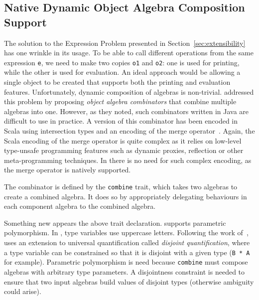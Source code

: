 \subsection{Native Dynamic Object Algebra Composition Support}
\label{sec:dynamic}

The solution to the Expression Problem presented in
Section~\ref{sec:extensibility} has one wrinkle in its usage. To be able to call
different operations from the same expression \lstinline{e}, we need to make two
copies \lstinline{o1} and \lstinline{o2}: one is used for printing, while the
other is used for evaluation. An ideal approach would be allowing a single object
to be created that supports both the printing and evaluation features.
Unfortunately, dynamic composition of algebras is non-trivial.
\citet{oliveira2012extensibility} addressed this problem by proposing
\textit{object algebra combinators} that combine multiple algebras into one.
However, as they noted, such combinators written in Java are difficult to use in
practice. A version of this combinator has been encoded in Scala using
intersection types and an encoding of the merge
operator~\cite{oliveira2013feature, rendel14attributes}. Again, the Scala
encoding of the merge operator is quite complex as it relies on low-level
type-unsafe programming features such as dynamic proxies, reflection or other
meta-programming techniques. In \name there is no need for such complex
encoding, as the merge operator is natively supported.

The combinator is defined by the \lstinline{combine} trait, which takes two
algebras to create a combined algebra. It does so by appropriately delegating
behaviours in each component algebra to the combined algebra.


Something new appears the above trait declaration. \name supports parametric
polymorphism. In \name, type variables use uppercase letters. Following the work
of~\citet{alpuimdisjoint}, \name uses an extension to universal quantification
called \textit{disjoint quantification}, where a type variable can be
constrained so that it is disjoint with a given type (\lstinline{B * A} for
example). Parametric polymorphism is need because \lstinline{combine} must
compose algebras with arbitrary type parameters. A disjointness constraint is
needed to ensure that two input algebras build values of disjoint types
(otherwise ambiguity could arise).

